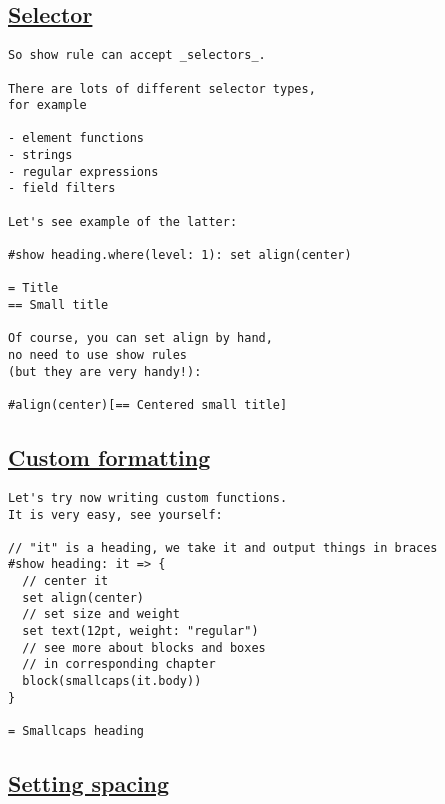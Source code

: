 \pandocbounded{}

\subsection{\texorpdfstring{\hyperref[selector]{Selector}}{Selector}}\label{selector}

\begin{verbatim}
So show rule can accept _selectors_.

There are lots of different selector types,
for example

- element functions
- strings
- regular expressions
- field filters

Let's see example of the latter:

#show heading.where(level: 1): set align(center)

= Title
== Small title

Of course, you can set align by hand,
no need to use show rules
(but they are very handy!):

#align(center)[== Centered small title]
\end{verbatim}

\pandocbounded{}

\subsection{\texorpdfstring{\hyperref[custom-formatting]{Custom
formatting}}{Custom formatting}}\label{custom-formatting}

\begin{verbatim}
Let's try now writing custom functions.
It is very easy, see yourself:

// "it" is a heading, we take it and output things in braces
#show heading: it => {
  // center it
  set align(center)
  // set size and weight
  set text(12pt, weight: "regular")
  // see more about blocks and boxes
  // in corresponding chapter
  block(smallcaps(it.body))
}

= Smallcaps heading
\end{verbatim}

\pandocbounded{}

\subsection{\texorpdfstring{\hyperref[setting-spacing]{Setting
spacing}}{Setting spacing}}\label{setting-spacing}

